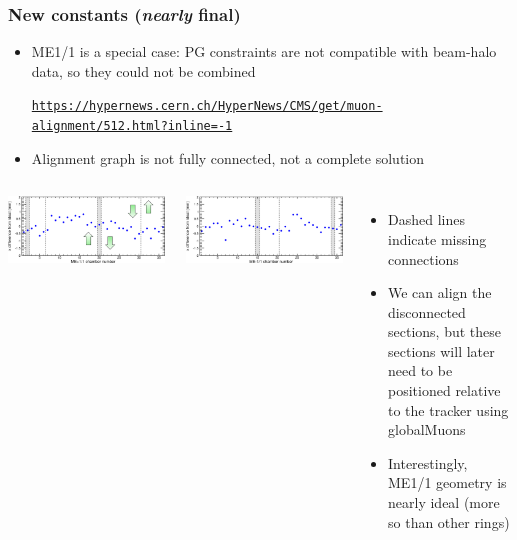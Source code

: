 \documentclass[compress]{beamer}
\begin{document}
\begin{frame}
\frametitle{New constants ({\it nearly} final)}

\begin{itemize}
\item ME1/1 is a special case: PG constraints are not compatible with
  beam-halo data, so they could not be combined

\href{https://hypernews.cern.ch/HyperNews/CMS/get/muon-alignment/512.html?inline=-1}{\tt \tiny https://hypernews.cern.ch/HyperNews/CMS/get/muon-alignment/512.html?inline=-1}

\item Alignment graph is not fully connected, not a complete solution
\end{itemize}

\begin{columns}
\includegraphics[width=\linewidth]{dependence_on_weights_p11.png}

\includegraphics[width=\linewidth]{dependence_on_weights_m11.png}

\begin{itemize}
\item Dashed lines indicate missing connections

\item We can align the disconnected sections, but these sections will
  later need to be positioned relative to the tracker using
  globalMuons

\item Interestingly, ME1/1 geometry is nearly ideal (more so than other rings)
\end{itemize}
\end{columns}
\end{frame}
\end{document}
